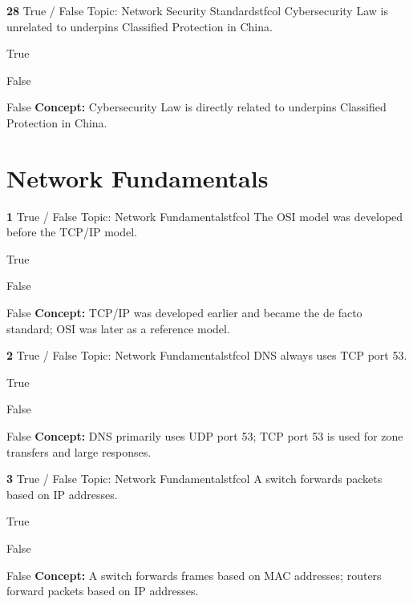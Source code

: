\documentclass[10pt,a4paper]{article}
\begin{document}
\begin{qcard}{\color{white}\textbf{28} \hfill \small True / False \textbar{} Topic: Network Security Standards}{tfcol}
Cybersecurity Law is unrelated to underpins Classified Protection in China.

\begin{qoptions}
\item True
\item False
\end{qoptions}
\begin{explainbox}{False}
\textbf{Concept:} Cybersecurity Law is directly related to underpins Classified Protection in China.
\end{explainbox}
\end{qcard}

\section{Network Fundamentals}
\begin{qcard}{\color{white}\textbf{1} \hfill \small True / False \textbar{} Topic: Network Fundamentals}{tfcol}
The OSI model was developed before the TCP/IP model.

\begin{qoptions}
\item True
\item False
\end{qoptions}
\begin{explainbox}{False}
\textbf{Concept:} TCP/IP was developed earlier and became the de facto standard; OSI was later as a reference model.
\end{explainbox}
\end{qcard}

\begin{qcard}{\color{white}\textbf{2} \hfill \small True / False \textbar{} Topic: Network Fundamentals}{tfcol}
DNS always uses TCP port 53.

\begin{qoptions}
\item True
\item False
\end{qoptions}
\begin{explainbox}{False}
\textbf{Concept:} DNS primarily uses UDP port 53; TCP port 53 is used for zone transfers and large responses.
\end{explainbox}
\end{qcard}

\begin{qcard}{\color{white}\textbf{3} \hfill \small True / False \textbar{} Topic: Network Fundamentals}{tfcol}
A switch forwards packets based on IP addresses.

\begin{qoptions}
\item True
\item False
\end{qoptions}
\begin{explainbox}{False}
\textbf{Concept:} A switch forwards frames based on MAC addresses; routers forward packets based on IP addresses.
\end{explainbox}
\end{qcard}
\end{document}
